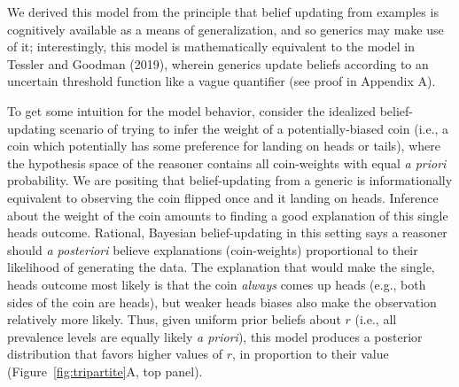 \documentclass[floatsintext,doc]{apa6}
\newcommand{\ndg}[1]{{\textcolor{Green}{[ndg: #1]}}}
\begin{document}

\noindent We derived this model from the principle that belief updating from examples is cognitively available as a means of generalization, and so generics may make use of it; interestingly, this model is mathematically equivalent to the model in Tessler and Goodman (2019), wherein generics update beliefs according to an uncertain threshold function like a vague quantifier (see proof in Appendix A). 

To get some intuition for the model behavior, consider the idealized belief-updating scenario of trying to infer the weight of a potentially-biased coin (i.e., a coin which potentially has some preference for landing on heads or tails), where the hypothesis space of the reasoner contains all coin-weights with equal \emph{a priori} probability.
We are positing that belief-updating from a generic is informationally equivalent to observing the coin flipped once and it landing on heads.
Inference about the weight of the coin amounts to finding a good explanation of this single heads outcome.
Rational, Bayesian belief-updating in this setting says a reasoner should \emph{a posteriori} believe explanations (coin-weights) proportional to their likelihood of generating the data.
The explanation that would make the single, heads outcome most likely is that the coin \emph{always} comes up heads (e.g., both sides of the coin are heads), but weaker heads biases also make the observation relatively more likely.
Thus, given uniform prior beliefs about $r$ (i.e., all prevalence levels are equally likely \emph{a priori}), this model produces a posterior distribution that favors higher values of $r$, in proportion to their value (Figure~\ref{fig:tripartite}A, top panel). 
\end{document}
